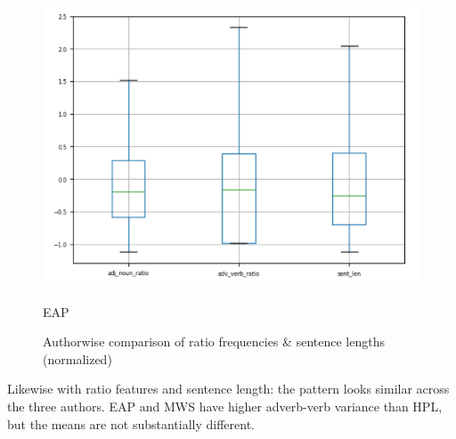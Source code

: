 \documentclass[12pt]{article}
\begin{document}
\begin{figure}[h]
\begin{multicols}{3}
      \includegraphics[width=\linewidth]{images/ratio_eap.png}\par\caption{EAP}
  \end{multicols} 

  \caption{Authorwise comparison of ratio frequencies \& sentence lengths (normalized)}
  \label{fig:punc}

\end{figure}

Likewise with ratio features and sentence length: the pattern looks similar across the three authors. EAP and MWS have higher adverb-verb variance than HPL, but the means are not substantially different.
\end{document}

